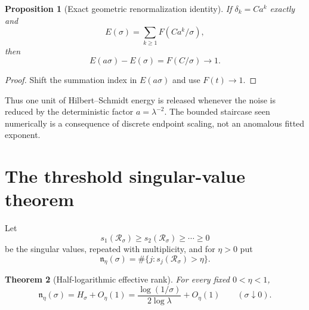 \documentclass[11pt]{article}
\newtheorem{theorem}{Theorem}[section]
\newtheorem{proposition}[theorem]{Proposition}
\theoremstyle{definition}
\theoremstyle{remark}
\newcommand{\cR}{\mathcal R}
\newcommand{\ranketa}{\mathfrak n_\eta}
\begin{document}
\begin{proposition}[Exact geometric renormalization identity]
\label{prop:geometric-renormalization}
If $\delta_k=C a^k$ exactly and
\begin{equation}\label{eq:geometric-energy}
 E(\sigma)=\sum_{k\ge1}F(Ca^k/\sigma),
\end{equation}
then
\begin{equation}\label{eq:energy-renormalization}
 E(a\sigma)-E(\sigma)=F(C/\sigma)\longrightarrow1.
\end{equation}
\end{proposition}

\begin{proof}
Shift the summation index in $E(a\sigma)$ and use $F(t)\to1$.
\end{proof}

Thus one unit of Hilbert--Schmidt energy is released whenever the noise is
reduced by the deterministic factor $a=\lambda^{-2}$.  The bounded staircase
seen numerically is a consequence of discrete endpoint scaling, not an
anomalous fitted exponent.

\section{The threshold singular-value theorem}
\label{sec:rank-law}

Let
\begin{equation}\label{eq:singular-values}
 s_1(\cR_\sigma)\ge s_2(\cR_\sigma)\ge\cdots\ge0
\end{equation}
be the singular values, repeated with multiplicity, and for $\eta>0$ put
\begin{equation}\label{eq:threshold-count}
 \ranketa(\sigma)
 =\#\{j:s_j(\cR_\sigma)>\eta\}.
\end{equation}

\begin{theorem}[Half-logarithmic effective rank]
\label{thm:rank-law}
For every fixed $0<\eta<1$,
\begin{equation}\label{eq:rank-law}
 \boxed{
 \ranketa(\sigma)
 =H_\sigma+O_\eta(1)
 =\frac{\log(1/\sigma)}{2\log\lambda}+O_\eta(1)}
 \qquad(\sigma\downarrow0).
\end{equation}
\end{theorem}
\end{document}

